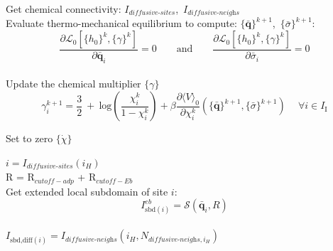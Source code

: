 \documentclass{article}
\begin{document}
    \begin{algorithm}
    \caption{Explicit evaluation of the Master Equation (Forward-Euler)}\label{alg:explicit-master-equation}
    \begin{algorithmic}
    
    \State Get chemical connectivity: $I_{\textit{diffusive-sites}}$,\ $I_{\textit{diffusive-neighs}}$ \\
    
    \State Evaluate thermo-mechanical equilibrium to compute: $\{\bar{\textbf{q}}\}^{k+1}$,\ $\{\bar{\sigma}\}^{k+1}$:
    \begin{equation*}
        \frac{\partial \mathcal{L}_0[\{h_0\}^k, \{\gamma\}^k]}{\partial \bar{\textbf{q}}_i} = 0 \qquad \text{and} \qquad \frac{\partial \mathcal{L}_0[\{h_0\}^k, \{\gamma\}^k]}{\partial \bar{\sigma}_i} = 0
    \end{equation*}\\
    
    \State Update the chemical multiplier $\{\gamma\}$
    \begin{equation*}
        \gamma_i^{k+1} = \frac{3}{2}\ +\ \text{log}\left(\frac{\chi_i^{k}}{1 - \chi_i^{k}}\right) + \beta \frac{\partial \langle V \rangle_0}{\partial \chi_i^k}(\{\bar{\textbf{q}}\}^{k+1},\{\bar{\sigma}\}^{k+1})\ \quad \forall i \in I_{\text{I}}
    \end{equation*}
    
    \State Set to zero $\{\dot{\chi}\}$\\
    
    \vspace{0.2cm}  
        \vspace{0.2cm}  
    
        \State $i = I_{\textit{diffusive-sites}}(i_H)$ \\
        
        \State R = R$_{cutoff-adp}$ + R$_{cutoff-Eb}$  \\
    
        \State Get extended local subdomain of site $i$:
        \begin{equation*}
            I_{\text{sbd}(i)}^{eb} = \mathcal{S}(\bar{\mathbf{q}}_i,R)
        \end{equation*}\\
    
        \State $I_{\text{sbd,diff}(i)} = I_{\textit{diffusive-neighs}}(i_H, N_{\textit{diffusive-neighs},i_H})$ \\
        \vspace{0.2cm}        
    

\end{algorithmic}
\end{algorithm}
\end{document}
